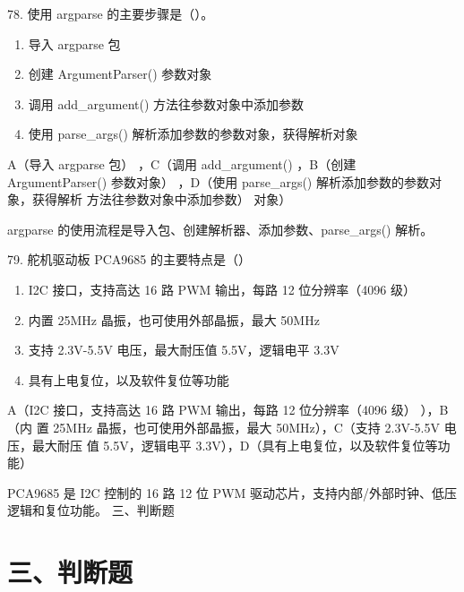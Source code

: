 \begin{question}{78. 使用 argparse 的主要步骤是（）。}
\begin{enumerate}[label=\Alph*., leftmargin=2.4em, itemsep=0.2em]
\item 导入 argparse 包
\item 创建 ArgumentParser() 参数对象
\item 调用 add\_argument() 方法往参数对象中添加参数
\item 使用 parse\_args() 解析添加参数的参数对象，获得解析对象
\end{enumerate}
\end{question}
\begin{answer}
A（导入 argparse 包） ，C（调用 add\_argument() ，B（创建 ArgumentParser() 参数对象） ，D（使用 parse\_args() 解析添加参数的参数对象，获得解析 方法往参数对象中添加参数） 对象）
\end{answer}
\begin{explanation}
argparse 的使用流程是导入包、创建解析器、添加参数、parse_args() 解析。
\end{explanation}

\begin{question}{79. 舵机驱动板 PCA9685 的主要特点是（）}
\begin{enumerate}[label=\Alph*., leftmargin=2.4em, itemsep=0.2em]
\item I2C 接口，支持高达 16 路 PWM 输出，每路 12 位分辨率（4096 级）
\item 内置 25MHz 晶振，也可使用外部晶振，最大 50MHz
\item 支持 2.3V-5.5V 电压，最大耐压值 5.5V，逻辑电平 3.3V
\item 具有上电复位，以及软件复位等功能
\end{enumerate}
\end{question}
\begin{answer}
A（I2C 接口，支持高达 16 路 PWM 输出，每路 12 位分辨率（4096 级） ），B（内 置 25MHz 晶振，也可使用外部晶振，最大 50MHz），C（支持 2.3V-5.5V 电压，最大耐压 值 5.5V，逻辑电平 3.3V），D（具有上电复位，以及软件复位等功能）
\end{answer}
\begin{explanation}
PCA9685 是 I2C 控制的 16 路 12 位 PWM 驱动芯片，支持内部/外部时钟、低压逻辑和复位功能。 三、判断题
\end{explanation}

\section{三、判断题}

